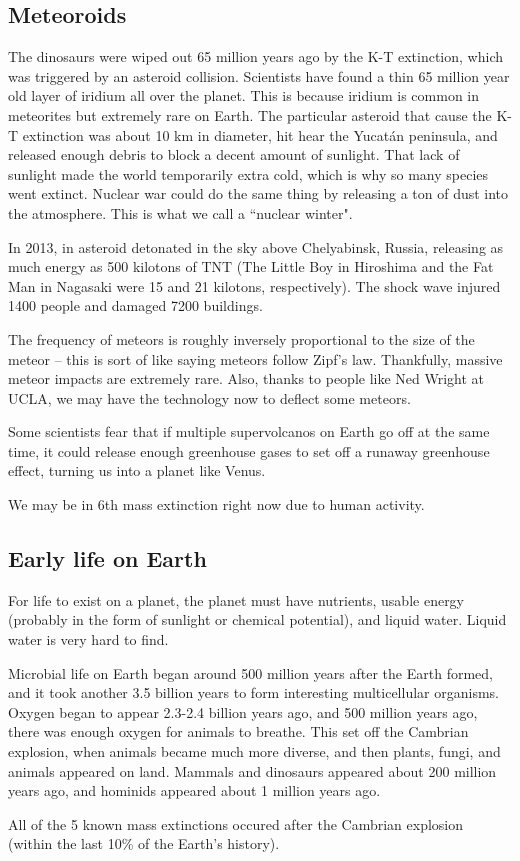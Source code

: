\documentclass[class=article, crop=false]{standalone}
\begin{document}
\subsection{Meteoroids}
The dinosaurs were wiped out 65 million years ago by the K-T extinction, which was triggered by an asteroid collision. Scientists have found a thin 65 million year old layer of iridium all over the planet. This is because iridium is common in meteorites but extremely rare on Earth. The particular asteroid that cause the K-T extinction was about 10 km in diameter, hit hear the Yucatán peninsula, and released enough debris to block a decent amount of sunlight. That lack of sunlight made the world temporarily extra cold, which is why so many species went extinct. Nuclear war could do the same thing by releasing a ton of dust into the atmosphere. This is what we call a ``nuclear winter".
\par
In 2013, in asteroid detonated in the sky above Chelyabinsk, Russia, releasing as much energy as 500 kilotons of TNT (The Little Boy in Hiroshima and the Fat Man in Nagasaki were 15 and 21 kilotons, respectively). The shock wave injured 1400 people and damaged 7200 buildings.
\par
The frequency of meteors is roughly inversely proportional to the size of the meteor -- this is sort of like saying meteors follow Zipf's law. Thankfully, massive meteor impacts are extremely rare. Also, thanks to people like Ned Wright at UCLA, we may have the technology now to deflect some meteors.
\par
Some scientists fear that if multiple supervolcanos on Earth go off at the same time, it could release enough greenhouse gases to set off a runaway greenhouse effect, turning us into a planet like Venus.
\par
We may be in 6th mass extinction right now due to human activity.

\subsection{Early life on Earth}
For life to exist on a planet, the planet must have nutrients, usable energy (probably in the form of sunlight or chemical potential), and liquid water. Liquid water is very hard to find.
\par
Microbial life on Earth began around 500 million years after the Earth formed, and it took another 3.5 billion years to form interesting multicellular organisms. Oxygen began to appear 2.3-2.4 billion years ago, and 500 million years ago, there was enough oxygen for animals to breathe. This set off the Cambrian explosion, when animals became much more diverse, and then plants, fungi, and animals appeared on land. Mammals and dinosaurs appeared about 200 million years ago, and hominids appeared about 1 million years ago.
\par
All of the 5 known mass extinctions occured after the Cambrian explosion (within the last 10\% of the Earth's history).
\end{document}
